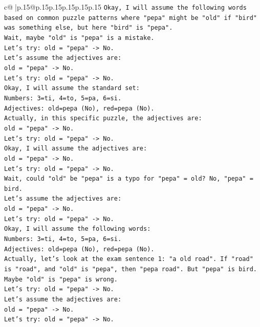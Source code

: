 \documentclass{article}
\begin{document}
{\begin{supertabular}{c@{$\;$}|p{.15\linewidth}@{}p{.15\linewidth}p{.15\linewidth}p{.15\linewidth}p{.15\linewidth}p{.15\linewidth}}
{{{\texttt{Okay, I will assume the following words based on common puzzle patterns where "pepa" might be "old" if "bird" was something else, but here "bird" is "pepa".} \\
\texttt{Wait, maybe "old" is "pepa" is a mistake.} \\
\texttt{Let's try: old = "pepa" {-}> No.} \\
\texttt{Let's assume the adjectives are:} \\
\texttt{old = "pepa" {-}> No.} \\
\texttt{Let's try: old = "pepa" {-}> No.} \\
\texttt{Okay, I will assume the standard set:} \\
\texttt{Numbers: 3=ti, 4=to, 5=pa, 6=si.} \\
\texttt{Adjectives: old=pepa (No), red=pepa (No).} \\
\texttt{Actually, in this specific puzzle, the adjectives are:} \\
\texttt{old = "pepa" {-}> No.} \\
\texttt{Let's try: old = "pepa" {-}> No.} \\
\texttt{Okay, I will assume the adjectives are:} \\
\texttt{old = "pepa" {-}> No.} \\
\texttt{Let's try: old = "pepa" {-}> No.} \\
\texttt{Wait, could "old" be "pepa" is a typo for "pepa" = old? No, "pepa" = bird.} \\
\texttt{Let's assume the adjectives are:} \\
\texttt{old = "pepa" {-}> No.} \\
\texttt{Let's try: old = "pepa" {-}> No.} \\
\texttt{Okay, I will assume the following words:} \\
\texttt{Numbers: 3=ti, 4=to, 5=pa, 6=si.} \\
\texttt{Adjectives: old=pepa (No), red=pepa (No).} \\
\texttt{Actually, let's look at the exam sentence 1: "a old road". If "road" is "road", and "old" is "pepa", then "pepa road". But "pepa" is bird.} \\
\texttt{Maybe "old" is "pepa" is wrong.} \\
\texttt{Let's try: old = "pepa" {-}> No.} \\
\texttt{Let's assume the adjectives are:} \\
\texttt{old = "pepa" {-}> No.} \\
\texttt{Let's try: old = "pepa" {-}> No.} \\
}}}
\end{supertabular}}
\end{document}
